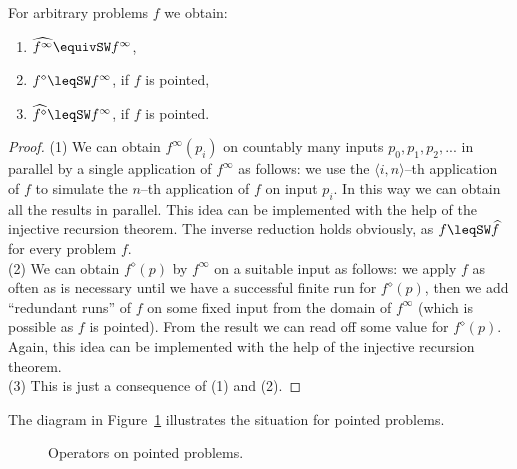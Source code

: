 \documentclass{lmcs}
\begin{document}
\begin{prop}
\label{prop:parallelization-diamond}
For arbitrary problems $f$ we obtain:
\begin{enumerate}
\item $\widehat{f^\infty}\equivSW f^\infty$,
\item $f^\diamond\leqSW f^\infty$, if $f$ is pointed,
\item $\widehat{f^\diamond}\leqSW f^\infty$, if $f$ is pointed.
\end{enumerate}
\end{prop}
\begin{proof}
(1) We can obtain $f^\infty(p_i)$ on countably many inputs $p_0,p_1,p_2,...$ in parallel
by a single application of $f^\infty$ as follows: we use the $\langle i,n\rangle$--th application
of $f$ to simulate the $n$--th application of $f$ on input $p_i$. In this way we can
obtain all the results in parallel. This idea can be implemented with the help
of the injective recursion theorem.
The inverse reduction holds obviously, as $f\leqSW\widehat{f}$ for every problem $f$.\\
(2) We can obtain $f^\diamond(p)$ by $f^\infty$ on a suitable input as follows:
we apply $f$ as often as is necessary until we have a successful finite run
for $f^\diamond(p)$, then we add ``redundant runs'' of $f$ on some fixed input
from the domain of $f^\infty$ (which is possible as $f$ is pointed).
From the result we can read off some value for $f^\diamond(p)$. 
Again, this idea can be implemented with the help of the injective recursion theorem.\\
(3) This is just a consequence of (1) and (2).
\end{proof}

\noindent
The diagram in Figure~\ref{fig:operators} illustrates the situation for pointed problems.

\begin{figure}[htb]
\begin{center}
\caption{Operators on pointed problems.}
\label{fig:operators}
\end{center}
\end{figure}
\end{document}
